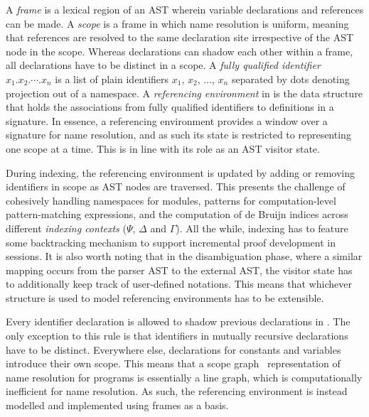 
A \textit{frame} is a lexical region of an \ac{AST} wherein variable declarations and references can be made.
A \textit{scope} is a frame in which name resolution is uniform, meaning that references are resolved to the same declaration site irrespective of the \ac{AST} node in the scope.
Whereas declarations can shadow each other within a frame, all declarations have to be distinct in a scope.
A \textit{fully qualified identifier} $x_1.x_2.\cdots.x_n$ is a list of plain identifiers $x_1$, $x_2$, $\dots$, $x_n$ separated by dots denoting projection out of a namespace.
A \textit{referencing environment} in \Beluga is the data structure that holds the associations from fully qualified identifiers to definitions in a signature.
In essence, a referencing environment provides a window over a signature for name resolution, and as such its state is restricted to representing one scope at a time.
This is in line with its role as an \ac{AST} visitor state.

During indexing, the referencing environment is updated by adding or removing identifiers in scope as \ac{AST} nodes are traversed.
This presents the challenge of cohesively handling namespaces for modules, patterns for computation-level pattern-matching expressions, and the computation of de Bruijn indices across different \textit{indexing contexts} ($\Psi$, $\Delta$ and $\Gamma$).
All the while, indexing has to feature some backtracking mechanism to support incremental proof development in \Harpoon sessions.
It is also worth noting that in the disambiguation phase, where a similar mapping occurs from the parser \ac{AST} to the external \ac{AST}, the visitor state has to additionally keep track of user-defined notations.
This means that whichever structure is used to model referencing environments has to be extensible.


Every identifier declaration is allowed to shadow previous declarations in \Beluga.
The only exception to this rule is that identifiers in mutually recursive declarations have to be distinct.
Everywhere else, declarations for constants and variables introduce their own scope.
This means that a scope graph~\cite{nameresolution} representation of name resolution for \Beluga programs is essentially a line graph, which is computationally inefficient for name resolution.
As such, the referencing environment is instead modelled and implemented using frames as a basis.

